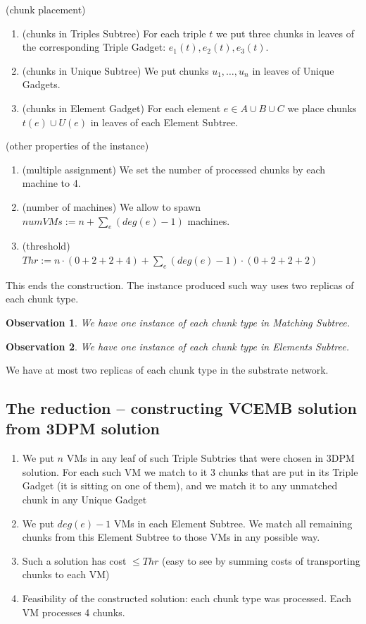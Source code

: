 \documentclass[conference,10pt]{IEEEtran}
\newtheorem{obs}{Observation}
\begin{document}
(chunk placement)
\begin{enumerate}
\item (chunks in Triples Subtree) For each triple
  $t$ we put three chunks in leaves of
  the corresponding Triple Gadget: $e_1(t), e_2(t), e_3(t)$.
\item (chunks in Unique Subtree) We put chunks $u_1,\ldots, u_n$ in leaves of
  Unique Gadgets.
\item (chunks in Element Gadget) For each element $e\in A\cup B\cup C$ we place chunks
  $t(e)\cup U(e)$ in leaves of each Element Subtree.
\end{enumerate}

(other properties of the instance)
\begin{enumerate}
\item (multiple assignment) We set the number of processed chunks by
  each machine to 4.
\item (number of machines) We allow to spawn
  $numVMs := n + \sum_{e}(deg(e)-1)$ machines.
\item (threshold)
  $Thr := n\cdot (0 + 2 + 2 + 4) + \sum_{e}(deg(e)-1)\cdot (0 + 2 + 2 + 2)$
\end{enumerate}

This ends the construction. The instance produced such way uses two replicas of each chunk type.

\begin{obs}
We have one instance of each chunk type in Matching Subtree.
\end{obs}

\begin{obs}
We have one instance of each chunk type in Elements Subtree.
\end{obs}

\begin{corollary}
We have at most two replicas of each chunk type in the substrate network.
\end{corollary}


\subsection{The reduction -- constructing VCEMB solution from 3DPM
  solution}

\begin{enumerate}
  \item We put $n$ VMs in any leaf of such Triple Subtries that were
  chosen in 3DPM solution. For each such VM we match to it 3 chunks
  that are put in its Triple Gadget (it is sitting on one of them),
  and we match it to any unmatched chunk in any Unique Gadget
  \item We put $deg(e)-1$ VMs in each Element Subtree. We match all remaining
  chunks from this Element Subtree to those VMs in any possible
  way.
  \item Such a solution has cost $\leq Thr$ (easy to see by
  summing costs of transporting chunks to each VM)
  \item Feasibility of the constructed solution: each chunk type was processed. Each VM processes 4 chunks.
\end{enumerate}
\end{document}
